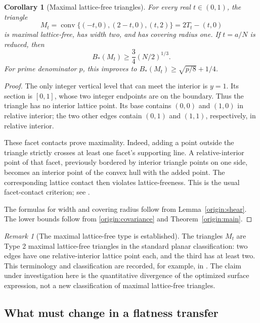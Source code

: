 \documentclass[11pt,a4paper]{article}
\newtheorem{corollary}[theorem]{Corollary}
\theoremstyle{remark}\newtheorem{remark}[theorem]{Remark}
\DeclareMathOperator{\conv}{conv}
\newcommand{\Bopt}{B_*}
\begin{document}
\begin{corollary}[Maximal lattice-free triangles]\label{origin:maximal}
For every real $t\in(0,1)$, the triangle
\[
 M_t=\conv\{(-t,0),(2-t,0),(t,2)\}
       =2T_t-(t,0)
\]
is maximal lattice-free, has width two, and has covering radius
one. If $t=a/N$ is reduced, then
\[
 \Bopt(M_t)\ge\frac34(N/2)^{1/3}.
\]
For prime denominator $p$, this improves to
$\Bopt(M_t)\ge\sqrt{p/8}+1/4$.
\end{corollary}

\begin{proof}
The only integer vertical level that can meet the interior is
$y=1$. Its section is $[0,1]$, whose two integer endpoints are
on the boundary. Thus the triangle has no interior lattice point.
Its base contains $(0,0)$ and $(1,0)$ in relative interior; the
two other edges contain $(0,1)$ and $(1,1)$, respectively, in
relative interior.

These facet contacts prove maximality. Indeed, adding a point
outside the triangle strictly crosses at least one facet's
supporting line. A relative-interior point of that facet, previously
bordered by interior triangle points on one side, becomes an
interior point of the convex hull with the added point. The
corresponding lattice contact then violates lattice-freeness.
This is the usual facet-contact criterion; see
\cite[Theorem 1 and its converse discussion]{Averkov}.

The formulas for width and covering radius follow from
Lemma~\ref{origin:shear}. The lower bounds follow from
\eqref{origin:covariance} and Theorem~\ref{origin:main}.
\end{proof}

\begin{remark}[The maximal lattice-free type is established]
The triangles $M_t$ are Type 2 maximal lattice-free triangles in
the standard planar classification: two edges have one
relative-interior lattice point each, and the third has at least
two. This terminology and classification are recorded, for
example, in \cite[Theorem 1.2 and the following definitions]{BHK}.
The claim under investigation here is the quantitative divergence
of the optimized surface expression, not a new classification of
maximal lattice-free triangles.
\end{remark}

\subsection{What must change in a flatness transfer}
\end{document}
